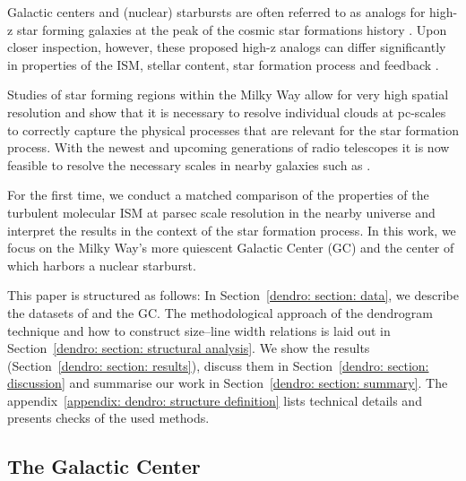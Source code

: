 Galactic centers and (nuclear) starbursts are often referred to as analogs for high-z star forming galaxies at the peak of the cosmic star formations history \citep[e.g.][]{2013MNRAS.435.2598K}. Upon closer inspection, however, these proposed high-z analogs can differ significantly in properties of the ISM, stellar content, star formation process and feedback \citep[e.g.][]{2017MNRAS.471.2311L,2019ApJ...872..146J}.

Studies of star forming regions within the Milky Way allow for very high spatial resolution and show that it is necessary to resolve individual clouds at pc-scales to correctly capture the physical processes that are relevant for the star formation process. 
With the newest and upcoming generations of radio telescopes it is now feasible to resolve the necessary scales in nearby galaxies such as .

For the first time, we conduct a matched comparison of the properties of the turbulent molecular ISM at parsec scale resolution in the nearby universe and interpret the results in the context of the star formation process.
In this work, we focus on the Milky Way's more quiescent Galactic Center (GC) and the center of  which harbors a nuclear starburst.

This paper is structured as follows: In Section~\ref{dendro: section: data}, we describe the datasets of  and the GC. The methodological approach of the dendrogram technique and how to construct size--line width relations is laid out in Section~\ref{dendro: section: structural analysis}. We show the results (Section~\ref{dendro: section: results}), discuss them in Section~\ref{dendro: section: discussion} and summarise our work in Section~\ref{dendro: section: summary}. The appendix~\ref{appendix: dendro: structure definition} lists technical details and presents checks of the used methods.

\subsection{The Galactic Center}

